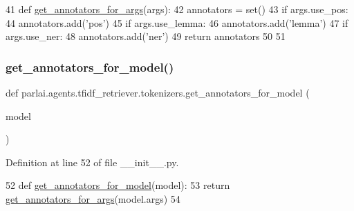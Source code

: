 \begin{DoxyCode}
41 \textcolor{keyword}{def }\hyperlink{namespaceparlai_1_1agents_1_1tfidf__retriever_1_1tokenizers_abbf344e2c42997de73bbe499f86cdba7}{get\_annotators\_for\_args}(args):
42     annotators = set()
43     \textcolor{keywordflow}{if} args.use\_pos:
44         annotators.add(\textcolor{stringliteral}{'pos'})
45     \textcolor{keywordflow}{if} args.use\_lemma:
46         annotators.add(\textcolor{stringliteral}{'lemma'})
47     \textcolor{keywordflow}{if} args.use\_ner:
48         annotators.add(\textcolor{stringliteral}{'ner'})
49     \textcolor{keywordflow}{return} annotators
50 
51 
\end{DoxyCode}
\mbox{\label{namespaceparlai_1_1agents_1_1tfidf__retriever_1_1tokenizers_ab7667918dcbcaef77377c42adc16c2f6}} 
\subsubsection{\texorpdfstring{get\+\_\+annotators\+\_\+for\+\_\+model()}{get\_annotators\_for\_model()}}
{\footnotesize\ttfamily def parlai.\+agents.\+tfidf\+\_\+retriever.\+tokenizers.\+get\+\_\+annotators\+\_\+for\+\_\+model (\begin{DoxyParamCaption}\item[{}]{model }\end{DoxyParamCaption})}



Definition at line 52 of file \+\_\+\+\_\+init\+\_\+\+\_\+.\+py.


\begin{DoxyCode}
52 \textcolor{keyword}{def }\hyperlink{namespaceparlai_1_1agents_1_1tfidf__retriever_1_1tokenizers_ab7667918dcbcaef77377c42adc16c2f6}{get\_annotators\_for\_model}(model):
53     \textcolor{keywordflow}{return} \hyperlink{namespaceparlai_1_1agents_1_1tfidf__retriever_1_1tokenizers_abbf344e2c42997de73bbe499f86cdba7}{get\_annotators\_for\_args}(model.args)
54 \end{DoxyCode}
\mbox{\label{namespaceparlai_1_1agents_1_1tfidf__retriever_1_1tokenizers_a6e3556406937a237816d642d9e610a60}} 
